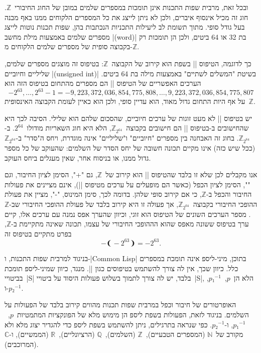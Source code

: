 ובכל זאת, מרבית שפות התכנות אינן תומכות במספרים שלמים במובן של החוג
החיבורי~$ℤ$. חוג זה מכיל אינסוף איברים, ולכן לא ניתן לייצג את כל המספרים
הלקוחים ממנו באף מבנה בעל גודל סופי. מתוך תשומת לב ליעילות התכניות הנכתבות בהן,
שפות תכנות נוטות לייצג מספרים שלמים באמצעות מילת מחשב \E|(word)| בת 32 או 64
ביטים, ולכן הן תומכות רק בקבוצה סופית של מספרים שלמים הלקוחים מ-$ℤ$.

כך לדוגמה, הטיפוס \E|| בשפת \Java הוא קירוב של הקבוצה~$ℤ$: בטיפוס זה מוצגים
מספרים שלמים, שליליים וחיוביים \E|(unsigned int)| בשיטת "המשלים לשתיים" באמצעות מילה בת
64 ביטים.
הערכים האפשריים של הטיפוס \E|| הם מספרים מהתחום
בטיפוס הזה הוא \begin{equation}
-2^{63},…,2^{63}-1=-9,223,372,036,854,775,808,…,9,223,372,036,854,775,807
\end{equation}
על אף היות התחום גדול מאוד, הוא עדיין סופי, ולכן הוא כאיין לעומת
הקבוצה האינסופית~$ℤ$.

יש בטיפוס \E|| לא מעט זוגות של ערכים חיוביים, שהסכום שלהם הוא שלילי.
הסיבה לכך היא שהחישובים ב-\Java בטיפוס \E|| הם חישובים
בקבוצה~$ℤ_{2^{64}}$, הלא היא חוג השאריות מודולו~$2^{64}$. ב-$ℤ_{2^{64}}$. בחוג
זה האבחנה בין מספרים "חיוביים" ו"שליליים" אינה מוגדרת, ויחס ה"סדר"
ב-$ℤ_{2^{64}}$ (ככל שיש כזה) אינו מקיים תכונה חשובה של יחס הסדר של השלמים:
שהעוקב של כל מספר גדול ממנו, או בניסוח אחר, שאין מעגלים ביחס העוקב.

אנו מקבלים לכן שלא זו בלבד שהטיפוס \E|| הוא קירוב של~$ℤ$, גם "\cc+",
הסימן לציון החיבור, וגם "\cc*", הסימן לציון הכפל \Java (כאשר הם
מופעלים על ערכים מטיפוס \E||), אינם מציינים את פעולות החיבור והכפל
ב-$ℤ$, כי אם קירוב סופי שלהן. בדומה לכך, סימן המינוס, "\cc-", מציין את פעולת
ההופכי החיבורי בקבוצה~$ℤ_{2^{64}}$, אך פעולה זו היא קירוב בלבד של פעולת ההופכי
החיבורי שב-$ℤ$. מספר הערכים השונים של הטיפוס  הוא זוגי, וכיוון
שהערך אפס נמנה עם ערכים אלו, קיים ערך בטיפוס ששונה מאפס שהוא הההופכי החיבורי של
עצמו,
תכונה שאינה מתקיימת ב-$ℤ$, בפרט מתקיים בטיפוס זה \begin{equation*}
-❨-2^{63}❩=-2^{63}.
\end{equation*}

בניגוד למרבית שפות התכנות, ו-\E|Common Lisp| בתוכן, מיני-ליספ אינה תומכת
במספרים כלל. כיוון שכך, אין לה צורך להשתמש בטיפוסים כגון \E||. מנגד,
כיוון שמיני-ליספ תומכת בביטויי~\E|S| בלבד, יש לה צורך לתמוך בשלוש פעולות היסוד
על ביטויי~\E|S|, הלא הן~$p$,~$p₁^{-1}$, ו-$p₂^{-1}$.

האופרטורים של חיבור וכפל במרבית שפות תכנות מהווים קירוב בלבד של הפעולות על
השלמים. בניגוד לזאת, הפעולות בשפת ליספ הן מימוש מלא של הפונקציות
המתמטיות~$p$,~$p₁^{-1}$, ו-$p₂^{-1}$. כפי שנראה בתרגילים, ניתן להשתמש בשפת
ליספ כדי להגדיר יצוג מלא ולא מקורב של~$ℕ$ (המספרים הטבעיים),~$ℤ$ (השלמים),~$ℚ$
(הרציונליים),~$ℝ$ (הממשיים), ו-$ℂ$ (המרוכבים).

